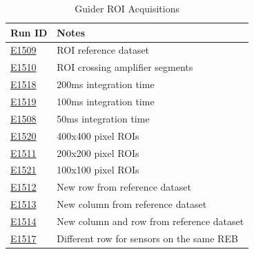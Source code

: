 \begin{table}[ht]\label{table:runs_guider}
\centering
\caption{Guider ROI Acquisitions}
\begin{tabular}{|p{1.5cm}|p{9cm}|}
\hline
Run ID & Notes \\ \hline
\href{https://s3df.slac.stanford.edu/data/rubin/lsstcam/E1509/w_2024_35/}{E1509} & ROI reference dataset\\ \hline
\href{https://s3df.slac.stanford.edu/data/rubin/lsstcam/E1510/w_2024_35/}{E1510} & ROI crossing amplifier segments\\ \hline
\href{https://s3df.slac.stanford.edu/data/rubin/lsstcam/E1518/w_2024_35/}{E1518} & 200ms integration time\\ \hline
\href{https://s3df.slac.stanford.edu/data/rubin/lsstcam/E1519/w_2024_35/}{E1519} & 100ms integration time\\ \hline
\href{https://s3df.slac.stanford.edu/data/rubin/lsstcam/E1508/w_2024_35/}{E1508} & 50ms integration time\\ \hline
\href{https://s3df.slac.stanford.edu/data/rubin/lsstcam/E1520/w_2024_35/}{E1520} & 400x400 pixel ROIs\\ \hline
\href{https://s3df.slac.stanford.edu/data/rubin/lsstcam/E1511/w_2024_35/}{E1511} & 200x200 pixel ROIs\\ \hline
\href{https://s3df.slac.stanford.edu/data/rubin/lsstcam/E1521/w_2024_35/}{E1521} & 100x100 pixel ROIs\\ \hline
\href{https://s3df.slac.stanford.edu/data/rubin/lsstcam/E1512/w_2024_35/}{E1512} & New row from reference dataset\\ \hline
\href{https://s3df.slac.stanford.edu/data/rubin/lsstcam/E1513/w_2024_35/}{E1513} & New column from reference dataset\\ \hline
\href{https://s3df.slac.stanford.edu/data/rubin/lsstcam/E1514/w_2024_35/}{E1514} & New column and row from reference dataset\\ \hline
\href{https://s3df.slac.stanford.edu/data/rubin/lsstcam/E1517/w_2024_35/}{E1517} & Different row for sensors on the same REB\\ \hline
\end{tabular}
\end{table}


\clearpage

